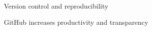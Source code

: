 \begin{frame}{Version control and reproducibility}

\end{frame}

\begin{frame}{GitHub increases productivity and transparency}

\end{frame}



% 
% 
% 
% 
% 
% 
% 
% 
% 
% 
% 
% 
% 
% 
% 
% 
% 
% 
% 
